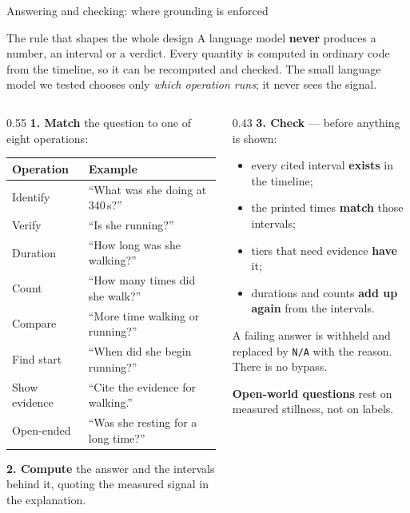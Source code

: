 \documentclass[aspectratio=169,11pt]{beamer}
\newcommand{\code}[1]{\texttt{\small #1}}
\newcommand{\hilite}[1]{\textcolor{atsorange}{\textbf{#1}}}
\begin{document}
\begin{frame}{Answering and checking: where grounding is enforced}
  \footnotesize
  \begin{block}{The rule that shapes the whole design}
    A language model \hilite{never} produces a number, an interval or a verdict.
    Every quantity is computed in ordinary code from the timeline, so it can be
    recomputed and checked. The small language model we tested chooses only
    \emph{which operation runs}; it never sees the signal.
  \end{block}
  \begin{columns}[T,onlytextwidth]
    \begin{column}{0.55\textwidth}
      \textbf{1. Match} the question to one of eight operations:
      \smallskip

      \begin{tabular}{@{}ll@{}}
        \toprule
        Operation & Example \\
        \midrule
        Identify      & ``What was she doing at 340\,s?'' \\
        Verify        & ``Is she running?'' \\
        Duration      & ``How long was she walking?'' \\
        Count         & ``How many times did she walk?'' \\
        Compare       & ``More time walking or running?'' \\
        Find start    & ``When did she begin running?'' \\
        Show evidence & ``Cite the evidence for walking.'' \\
        Open-ended    & ``Was she resting for a long time?'' \\
        \bottomrule
      \end{tabular}

      \smallskip
      \textbf{2. Compute} the answer and the intervals behind it, quoting the
      measured signal in the explanation.
    \end{column}
    \begin{column}{0.43\textwidth}
      \textbf{3. Check} --- before anything is shown:
      \begin{itemize}
        \item every cited interval \hilite{exists} in the timeline;
        \item the printed times \hilite{match} those intervals;
        \item tiers that need evidence \hilite{have} it;
        \item durations and counts \hilite{add up again} from the intervals.
      \end{itemize}

      \smallskip
      A failing answer is withheld and replaced by \code{N/A} with the reason.
      There is no bypass.

      \smallskip
      \textbf{Open-world questions} rest on measured stillness, not on labels.
    \end{column}
  \end{columns}
\end{frame}
\end{document}

